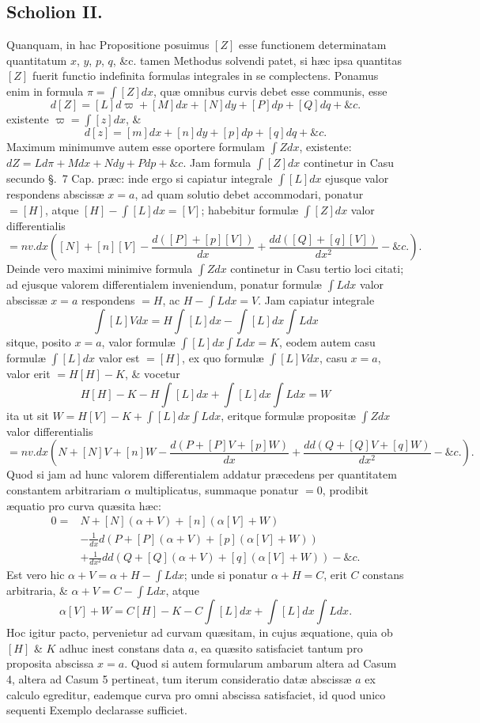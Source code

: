 \subsection*{Scholion II.}
Quanquam, in hac Propositione posuimus $[Z]$ esse functionem determinatam quantitatum $x$, $y$, $p$, $q$, \&c. tamen Methodus solvendi patet, si hæc ipsa quantitas $[Z]$ fuerit functio indefinita formulas integrales in se complectens. Ponamus enim in formula $\pi=\int[Z]dx$, quæ omnibus curvis debet esse communis, esse
\[d[Z]=[L]d\varpi+[M]dx+[N]dy+[P]dp+[Q]dq+\&c.\]
existente $\varpi=\int[z]dx$, \&
\[d[z]=[m]dx+[n]dy+[p]dp+[q]dq+\&c.\]
Maximum minimumve autem esse oportere formulam $\int Zdx$, existente: $dZ=Ld\pi+Mdx+Ndy+Pdp+\&c.$ Jam formula $\int[Z]dx$ continetur in Casu secundo §.~7 Cap. præc: inde ergo si capiatur integrale $\int[L]dx$ ejusque valor respondens abscissæ $x=a$, ad quam solutio debet accommodari, ponatur $=[H]$, atque $[H]-\int[L]dx=[V]$; habebitur formulæ $\int[Z]dx$ valor differentialis
\[=nv.dx\left([N]+[n][V]-\frac{d([P]+[p][V])}{dx}+\frac{dd([Q]+[q][V])}{dx^2}-\&c.\right).\]
Deinde vero maximi minimive formula $\int Zdx$ continetur in Casu tertio loci citati; ad ejusque valorem differentialem inveniendum, ponatur formulæ $\int Ldx$ valor abscissæ $x=a$ respondens $=H$, ac $H-\int Ldx=V$. Jam capiatur integrale
\[\int[L]Vdx=H\int[L]dx-\int[L]dx\int Ldx\]
sitque, posito $x=a$, valor formulæ $\int[L]dx\int Ldx=K$, eodem autem casu formulæ $\int[L]dx$ valor est $=[H]$, ex quo formulæ
$\int[L]Vdx$, casu $x=a$, valor erit $=H[H]-K$, \& vocetur
\[H[H]-K-H\int[L]dx+\int[L]dx\int Ldx=W\]
ita ut sit $W=H[V]-K+\int[L]dx\int Ldx$, eritque formulæ propositæ $\int Zdx$ valor differentialis
\[
=nv.dx\left(N+[N]V+[n]W-\frac{d(P+[P]V+[p]W)}{dx}+\frac{dd(Q+[Q]V+[q]W)}{dx^2}-\&c.\right).
\]
Quod si jam ad hunc valorem differentialem addatur præcedens per quantitatem constantem arbitrariam $\alpha$ multiplicatus, summaque ponatur $=0$, prodibit æquatio pro curva quæsita hæc:
\[
\begin{aligned}
0={}&N+[N](\alpha+V)+[n](\alpha[V]+W)\\
&-\frac1{dx}d(P+[P](\alpha+V)+[p](\alpha[V]+W))\\
&+\frac1{dx^2}dd(Q+[Q](\alpha+V)+[q](\alpha[V]+W))-\&c.
\end{aligned}
\]
Est vero hic $\alpha+V=\alpha+H-\int Ldx$; unde si ponatur $\alpha+H=C$, erit $C$ constans arbitraria, \& $\alpha+V=C-\int Ldx$, atque
\[\alpha[V]+W=C[H]-K-C\int[L]dx+\int[L]dx\int Ldx.\]
Hoc igitur pacto, pervenietur ad curvam quæsitam, in cujus æquatione, quia ob $[H]$ \& $K$ adhuc inest constans data $a$, ea quæsito satisfaciet tantum pro proposita abscissa $x=a$. Quod si autem formularum ambarum altera ad Casum 4, altera ad Casum 5 pertineat, tum iterum consideratio datæ abscissæ $a$ ex calculo egreditur, eademque curva pro omni abscissa satisfaciet, id quod unico sequenti Exemplo declarasse sufficiet.

